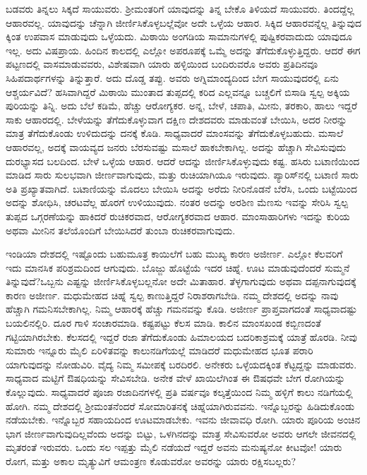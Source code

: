 ಬಡವರು ತಿನ್ನಲು ಸಿಕ್ಕದೆ ಸಾಯುವರು. ಶ‍್ರೀಮಂತರಿಗೆ ಯಾವುದನ್ನು ತಿನ್ನ ಬೇಕೊ ತಿಳಿಯದೆ ಸಾಯುವರು. ತಿಂದದ್ದೆಲ್ಲ ಆಹಾರವಲ್ಲ. ಯಾವುದನ್ನು ಚೆನ್ನಾಗಿ ಜೀರ್ಣಿಸಿಕೊಳ್ಳಬಲ್ಲೆವೋ ಅದೇ ಒಳ್ಳೆಯ ಆಹಾರ. ಸಿಕ್ಕಿದ ಆಹಾರವನ್ನೆಲ್ಲ ತಿನ್ನುವುದ ಕ್ಕಿಂತ ಉಪವಾಸ ಮಾಡುವುದು ಒಳ್ಳೆಯದು. ಮಿಠಾಯಿ ಅಂಗಡಿಯ ಸಾಮಾನುಗಳಲ್ಲಿ ಪುಷ್ಟಿಕರವಾದುದು ಯಾವುದೂ ಇಲ್ಲ. ಅದು ವಿಷಪ್ರಾಯ. ಹಿಂದಿನ ಕಾಲದಲ್ಲಿ ಎಲ್ಲೋ ಅಪರೂಪಕ್ಕೆ ಒಮ್ಮೆ ಅದನ್ನು ತೆಗೆದುಕೊಳ್ಳುತ್ತಿದ್ದರು. ಆದರೆ ಈಗ ಪಟ್ಟಣದಲ್ಲಿ ವಾಸಮಾಡು\break ವವರು, ವಿಶೇಷವಾಗಿ ಯಾರು ಹಳ್ಳಿಯಿಂದ ಬಂದಿರುವರೊ ಅವರು ಪ್ರತಿದಿನವೂ ಸಿಹಿಪದಾರ್ಥಗಳನ್ನು ತಿನ್ನುತ್ತಾರೆ. ಅದು ದೊಡ್ಡ ತಪ್ಪು. ಅವರು ಅಗ್ನಿಮಾಂದ್ಯದಿಂದ ಬೇಗ ಸಾಯುವುದರಲ್ಲಿ ಏನು ಆಶ್ಚರ್ಯವಿದೆ? ಹಸಿವಾಗಿದ್ದರೆ ಮಿಠಾಯಿ ಮುಂತಾದ ತುಪ್ಪದಲ್ಲಿ ಕರಿದ ಎಲ್ಲವನ್ನೂ ಬಚ್ಚಲಿಗೆ ಬಿಸಾಡಿ ಸ್ವಲ್ಪ ಅಕ್ಕಿಯ ಪುರಿಯನ್ನು ತಿನ್ನಿ. ಅದು ಬೆಲೆ ಕಡಿಮೆ, ಹೆಚ್ಚು ಆರೋಗ್ಯಕರ. ಅನ್ನ, ಬೇಳೆ, ಚಪಾತಿ, ಮೀನು, ತರಕಾರಿ, ಹಾಲು ಇದ್ದರೆ ಸಾಕು ಆಹಾರದಲ್ಲಿ. ಬೇಳೆಯನ್ನು ತೆಗೆದುಕೊಳ್ಳುವಾಗ ದಕ್ಷಿಣ ದೇಶದವರು ಮಾಡುವಂತೆ ಬೇಯಿಸಿ, ಅದರ ನೀರನ್ನು ಮಾತ್ರ ತೆಗೆದುಕೊಂಡು ಉಳಿದುದನ್ನು ದನಕ್ಕೆ ಕೊಡಿ. ಸಾಧ್ಯವಾದರೆ ಮಾಂಸವನ್ನು ತೆಗೆದುಕೊಳ್ಳಬಹುದು. ಮಸಾಲೆ ಆಹಾರವಲ್ಲ, ಅದಕ್ಕೆ ವಾಯವ್ಯದ ಜನರು ಬೆರಸುವಷ್ಟು ಮಸಾಲೆ ಹಾಕಬೇಕಾಗಿಲ್ಲ. ಅದನ್ನು ಹೆಚ್ಚಾಗಿ ಸೇವಿಸುವುದು ದುರಭ್ಯಾಸದ ಬಲದಿಂದ. ಬೇಳೆ ಒಳ್ಳೆಯ ಆಹಾರ. ಆದರೆ ಆದನ್ನು ಜೀರ್ಣಿಸಿಕೊಳ್ಳುವುದು ಕಷ್ಟ. ಹಸಿರು ಬಟಾಣಿಯಿಂದ ಮಾಡಿದ ಸಾರು ಸುಲಭವಾಗಿ ಜೀರ್ಣವಾಗುವುದು, ಮತ್ತು ರುಚಿಯಾಗಿಯೂ ಇರುವುದು. ಪ್ಯಾರಿಸ್​ನಲ್ಲಿ ಬಟಾಣಿ ಸಾರು ಅತಿ ಪ್ರಖ್ಯಾತವಾಗಿದೆ. ಬಟಾಣಿಯನ್ನು ಮೊದಲು ಬೇಯಿಸಿ ಅದನ್ನು ಅರೆದು ನೀರಿನೊಡನೆ ಬೆರೆಸಿ, ಒಂದು ಬಟ್ಟೆಯಿಂದ ಅದನ್ನು ಶೋಧಿಸಿ, ಚರಟವೆಲ್ಲ ಹೊರಗೆ ಉಳಿಯುವುದು. ನಂತರ ಅದನ್ನು ಅರಶಿಣ ಮೆಣಸು ಇವನ್ನು ಸೇರಿಸಿ ಸ್ವಲ್ಪ ತುಪ್ಪದ ಒಗ್ಗರಣೆಯನ್ನು ಹಾಕಿದರೆ ರುಚಿಕರವಾದ, ಆರೋಗ್ಯಕರವಾದ ಆಹಾರ. ಮಾಂಸಾಹಾರಿಗಳು ಇದನ್ನು ಕುರಿಯ ಅಥವಾ ಮೀನಿನ ತಲೆಯೊಂದಿಗೆ ಬೇಯಿಸಿದರೆ ತುಂಬಾ ರುಚಿಕರವಾಗುವುದು.

ಇಂಡಿಯಾ ದೇಶದಲ್ಲಿ ಇಷ್ಟೊಂದು ಬಹುಮೂತ್ರ ಕಾಯಿಲೆಗೆ ಬಹು ಮುಖ್ಯ ಕಾರಣ ಅಜೀರ್ಣ. ಎಲ್ಲೋ ಕೆಲವರಿಗೆ ಇದು ಮಾನಸಿಕ ಪರಿಶ್ರಮದಿಂದ ಆಗುವುದು. ಬೊಜ್ಜು ಹೊಟ್ಟೆಯೆ ಇದರ ಚಿಹ್ನೆ. ಊಟ ಮಾಡುವುದೆಂದರೆ ಸುಮ್ಮನೆ ತಿನ್ನುವುದೆ?ಒಬ್ಬನು ಎಷ್ಟನ್ನು ಜೀರ್ಣಿಸಿಕೊಳ್ಳಬಲ್ಲನೋ ಅದೇ ಮಿತಾಹಾರ. ತೆಳ್ಳಗಾಗುವುದು ಅಥವಾ ದಪ್ಪನಾಗುವುದಕ್ಕೆ ಕಾರಣ ಅಜೀರ್ಣ. ಮಧುಮೇಹದ ಚಿಹ್ನೆ ಸ್ವಲ್ಪ ಕಾಣುತ್ತಿದ್ದರೆ ನಿರಾಶರಾಗಬೇಡಿ. ನಮ್ಮ ದೇಶದಲ್ಲಿ ಅದನ್ನು ನಾವು ಹೆಚ್ಚಾಗಿ ಗಮನಿಸಬೇಕಾಗಿಲ್ಲ. ನಿಮ್ಮ ಆಹಾರಕ್ಕೆ ಹೆಚ್ಚು ಗಮನವನ್ನು ಕೊಡಿ. ಅಜೀರ್ಣ ಪ್ರಾಪ್ತವಾಗದಂತೆ ಸಾಧ್ಯವಾದಷ್ಟು ಬಯಲಿನಲ್ಲಿರಿ. ದೂರ ಗಾಳಿ ಸಂಚಾರಮಾಡಿ. ಕಷ್ಟಪಟ್ಟು ಕೆಲಸ ಮಾಡಿ. ಕಾಲಿನ ಮಾಂಸಖಂಡ ಕಬ್ಬಿಣದಂತೆ ಗಟ್ಟಿಯಾಗಿರಬೇಕು. ಕೆಲಸದಲ್ಲಿ ಇದ್ದರೆ ರಜಾ ತೆಗೆದುಕೊಂಡು ಹಿಮಾಲಯದ ಬದರಿಕಾ\break ಶ್ರಮಕ್ಕೆ ಯಾತ್ರೆ ಹೊರಡಿ. ನೀವು ಸುಮಾರು ಇನ್ನೂರು ಮೈಲಿ ಏರಿಳಿತವನ್ನು ಕಾಲುನಡಿಗೆ\break ಯಲ್ಲೆ ಮಾಡಿದರೆ ಮಧುಮೇಹದ ಭೂತ ಪರಾರಿ ಯಾಗುವುದನ್ನು ನೋಡುವಿರಿ. ವೈದ್ಯ ನಿಮ್ಮ ಸಮೀಪಕ್ಕೆ ಬರದಿರಲಿ. ಅನೇಕರು ಒಳ್ಳೆಯದಕ್ಕಿಂತ ಕೆಟ್ಟದ್ದನ್ನು ಮಾಡುವರು. ಸಾಧ್ಯವಾದ ಮಟ್ಟಿಗೆ ಔಷಧಿಯನ್ನು ಸೇವಿಸಬೇಡಿ. ಅನೇಕ ವೇಳೆ ಖಾಯಿಲೆಗಿಂತ ಈ ಔಷಧವೇ ಬೇಗ ರೋಗಿಯನ್ನು ಕೊಲ್ಲುವುದು. ಸಾಧ್ಯವಾದರೆ ಪೂಜಾ ರಜಾದಿನಗಳಲ್ಲಿ ಪ್ರತಿ ವರ್ಷವೂ ಕಲ್ಕತ್ತೆಯಿಂದ ನಿಮ್ಮ ಹಳ್ಳಿಗೆ ಕಾಲು ನಡಿಗೆಯಲ್ಲಿ ಹೋಗಿ. ನಮ್ಮ ದೇಶದಲ್ಲಿ ಶ‍್ರೀಮಂತನೆಂದರೆ ಸೋಮಾರಿತನಕ್ಕೆ ಚಿಹ್ನೆಯಾಗಿರುವವನು. ಇನ್ನೊಬ್ಬರನ್ನು ಹಿಡಿದುಕೊಂಡು ನಡೆಯಬೇಕು. ಇನ್ನೊಬ್ಬರ ಸಹಾಯದಿಂದ ಊಟಮಾಡಬೇಕು. ಇವನು ಜೀವಾವಧಿ ರೋಗಿ. ಯಾರು ಪೂರಿಯ ಅಂಚಿನ ಭಾಗ ಜೀರ್ಣವಾಗುವುದಿಲ್ಲವೆಂದು ಅದನ್ನು ಬಿಟ್ಟು, ಒಳಗಿನದನ್ನು ಮಾತ್ರ ಸೇವಿಸುವರೋ ಅವರು ಆಗಲೇ ಜೀವನದಲ್ಲಿ ಮೃತರಂತೆ ಇರುವರು. ಒಂದು ಸಲ ಇಪ್ಪತ್ತು ಮೈಲಿ ನಡೆಯದೆ ಇದ್ದರೆ ಅವನು ಮನುಷ್ಯನೋ ಕೀಟವೋ! ಯಾರು ರೋಗ, ಮತ್ತು ಅಕಾಲ ಮೃತ್ಯುವಿಗೆ ಆಮಂತ್ರಣ ಕೊಡುವರೋ ಅವರನ್ನು ಯಾರು ರಕ್ಷಿಸಬಲ್ಲರು?

